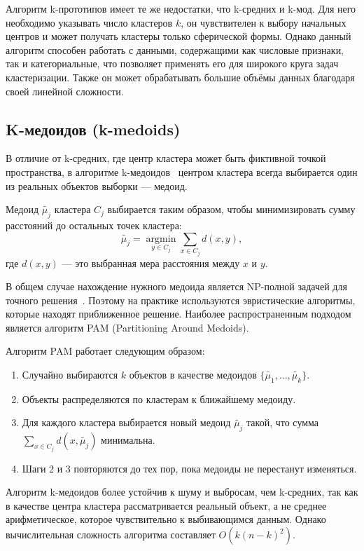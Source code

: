 Алгоритм k-прототипов имеет те же недостатки, что k-средних и k-мод. Для него необходимо указывать число кластеров $k$, он чувствителен к выбору начальных центров и может получать кластеры только сферической формы. Однако данный алгоритм способен работать с данными, содержащими как числовые признаки, так и категориальные, что позволяет применять его для широкого круга задач кластеризации. Также он может обрабатывать большие объёмы данных благодаря своей линейной сложности.

\subsection{K-медоидов (k-medoids)}
В отличие от k-средних, где центр кластера может быть фиктивной точкой пространства, в алгоритме k-медоидов~\cite{k_medoids} центром кластера всегда выбирается один из реальных объектов выборки --- медоид.

Медоид $\tilde{\mu_j}$ кластера $C_j$ выбирается таким образом, чтобы минимизировать сумму расстояний до остальных точек кластера:
\begin{equation}
	\tilde{\mu_j} = \operatorname*{argmin}_{y \in C_j} \sum_{x \in C_j} d(x, y),
\end{equation}
где $d(x, y)$ --- это выбранная мера расстояния между $x$ и $y$.

В общем случае нахождение нужного медоида является NP-полной задачей для точного решения~\cite{k_medoids_solve}. Поэтому на практике используются эвристические алгоритмы, которые находят приближенное решение. Наиболее распространенным подходом является алгоритм PAM (Partitioning Around Medoids).

Алгоритм PAM работает следующим образом:
\begin{enumerate}
	\item Случайно выбираются $k$ объектов в качестве медоидов $\{\tilde{\mu_1}, \dots, \tilde{\mu_k}\}$.
	\item Объекты распределяются по кластерам к ближайшему медоиду.
	\item Для каждого кластера выбирается новый медоид $\tilde{\mu_j}$ такой, что сумма $\sum\limits_{x \in C_j} d(x, \tilde{\mu_j})$ минимальна.
	\item Шаги 2 и 3 повторяются до тех пор, пока медоиды не перестанут изменяться.
\end{enumerate}

Алгоритм k-медоидов более устойчив к шуму и выбросам, чем k-средних, так как в качестве центра кластера рассматривается реальный объект, а не среднее арифметическое, которое чувствительно к выбивающимся данным. Однако вычислительная сложность алгоритма составляет $O(k(n-k)^2)$.

